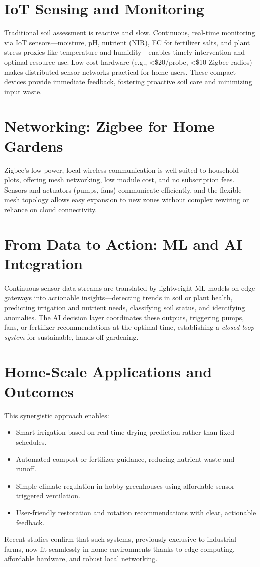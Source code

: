 \documentclass{sigchi}
\begin{document}
\section{IoT Sensing and Monitoring}

Traditional soil assessment is reactive and slow. Continuous, real-time monitoring via IoT sensors—moisture, pH, nutrient (NIR), EC for fertilizer salts, and plant stress proxies like temperature and humidity—enables timely intervention and optimal resource use. Low-cost hardware (e.g., <\$20/probe, <\$10 Zigbee radios) makes distributed sensor networks practical for home users. These compact devices provide immediate feedback, fostering proactive soil care and minimizing input waste.

\section{Networking: Zigbee for Home Gardens}

Zigbee’s low-power, local wireless communication is well-suited to household plots, offering mesh networking, low module cost, and no subscription fees. Sensors and actuators (pumps, fans) communicate efficiently, and the flexible mesh topology allows easy expansion to new zones without complex rewiring or reliance on cloud connectivity.

\section{From Data to Action: ML and AI Integration}

Continuous sensor data streams are translated by lightweight ML models on edge gateways into actionable insights—detecting trends in soil or plant health, predicting irrigation and nutrient needs, classifying soil status, and identifying anomalies. The AI decision layer coordinates these outputs, triggering pumps, fans, or fertilizer recommendations at the optimal time, establishing a \emph{closed-loop system} for sustainable, hands-off gardening.

\section{Home-Scale Applications and Outcomes}

This synergistic approach enables:
\begin{itemize}
	\item Smart irrigation based on real-time drying prediction rather than fixed schedules.
	\item Automated compost or fertilizer guidance, reducing nutrient waste and runoff.
	\item Simple climate regulation in hobby greenhouses using affordable sensor-triggered ventilation.
	\item User-friendly restoration and rotation recommendations with clear, actionable feedback.
\end{itemize}
Recent studies confirm that such systems, previously exclusive to industrial farms, now fit seamlessly in home environments thanks to edge computing, affordable hardware, and robust local networking.
\end{document}
